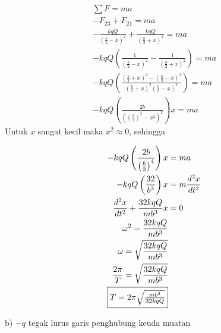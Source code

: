 \begin{enumerate}
    \begin{minipage}{0.5\textwidth}
    \begin{align*}
    \sum F = ma\\
    -F_{23}+F_{21} = ma\\
    -\frac{kqQ}{(\frac{b}{2}-x)^{2}}+\frac{kqQ}{(\frac{b}{2}+x)^{2}} = ma\\
    -kqQ\left ( \frac{1}{(\frac{b}{2}-x)^{2}}-\frac{1}{(\frac{b}{2}+x)^{2}} \right) = ma\\
    -kqQ\left ( \frac{\left ( \frac{b}{2}+x \right)^{2}-\left ( \frac{b}{2}-x \right )^{2}}{\left ( \frac{b}{2}+x \right)^{2}\left ( \frac{b}{2}-x \right )^{2}} \right ) = ma\\
    -kqQ\left ( \frac{2b}{\left ( \left ( \frac{b}{2} \right )^{2} -x^{2}\right )^{2}} \right )x = ma
    \end{align*}
    Untuk $x$ sangat kecil maka $x^{2} \approx 0$, sehingga
    \end{minipage}
    \hfill
    \begin{minipage}{0.5\textwidth}
    \begin{align*}
    -kqQ\left ( \frac{2b}{\left ( \frac{b}{2} \right )^{4}} \right )x &=ma\\   
    -kqQ\left ( \frac{32}{b^{3}} \right )x &=m\frac{d^{2}x}{dt^{2}}\\ 
    \frac{d^{2}x}{dt^{2}} + \frac{32kqQ}{mb^{3}}x&=0\\
    \omega^{2}=\frac{32kqQ}{mb^{3}} \\
    \omega = \sqrt{\frac{32kqQ}{mb^{3}}} \\
    \frac{2\pi}{T}= \sqrt{\frac{32kqQ}{mb^{3}}} \\
    \fbox{$T = 2\pi\sqrt{\frac{mb^{3}}{32kqQ}}$}
    \end{align*}
    \end{minipage}
    
    \pagebreak
    b) $-q$ tegak lurus garis penghubung keuda muatan


\end{enumerate}
